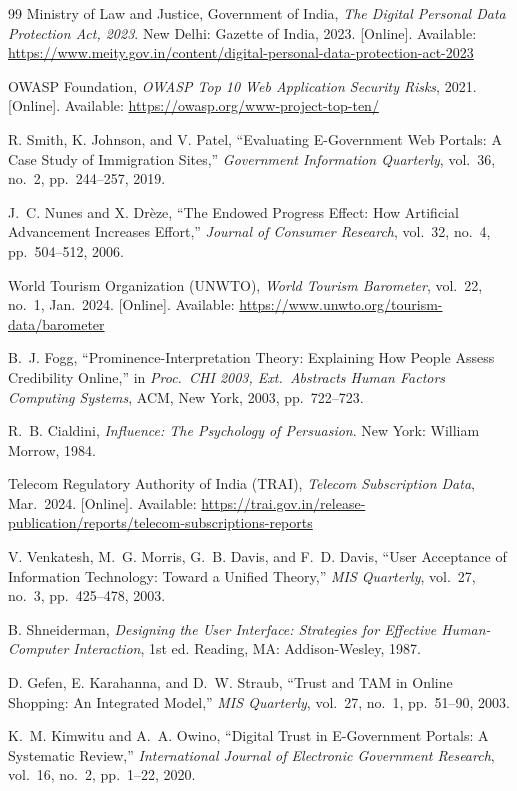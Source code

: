 \documentclass[journal, 10pt, twoside]{IEEEtran}
\begin{document}
\begin{thebibliography}{99}
  Ministry of Law and Justice, Government of India,
  \textit{The Digital Personal Data Protection Act, 2023}.
  New Delhi: Gazette of India, 2023.
  [Online]. Available:
  \url{https://www.meity.gov.in/content/digital-personal-data-protection-act-2023}

  OWASP Foundation,
  \textit{OWASP Top 10 Web Application Security Risks}, 2021.
  [Online]. Available: \url{https://owasp.org/www-project-top-ten/}

  R. Smith, K. Johnson, and V. Patel,
  ``Evaluating E-Government Web Portals: A Case Study of Immigration
  Sites,''
  \textit{Government Information Quarterly}, vol.~36, no.~2,
  pp.~244--257, 2019.

  J.~C. Nunes and X. Drèze,
  ``The Endowed Progress Effect: How Artificial Advancement Increases
  Effort,''
  \textit{Journal of Consumer Research}, vol.~32, no.~4,
  pp.~504--512, 2006.

  World Tourism Organization (UNWTO),
  \textit{World Tourism Barometer}, vol.~22, no.~1, Jan.\ 2024.
  [Online]. Available: \url{https://www.unwto.org/tourism-data/barometer}

  B.~J. Fogg,
  ``Prominence-Interpretation Theory: Explaining How People Assess
  Credibility Online,''
  in \textit{Proc.\ CHI 2003, Ext.\ Abstracts Human Factors Computing
  Systems}, ACM, New York, 2003, pp.~722--723.

  R.~B. Cialdini,
  \textit{Influence: The Psychology of Persuasion}.
  New York: William Morrow, 1984.

  Telecom Regulatory Authority of India (TRAI),
  \textit{Telecom Subscription Data}, Mar.\ 2024.
  [Online]. Available:
  \url{https://trai.gov.in/release-publication/reports/telecom-subscriptions-reports}

  V. Venkatesh, M.~G. Morris, G.~B. Davis, and F.~D. Davis,
  ``User Acceptance of Information Technology: Toward a Unified Theory,''
  \textit{MIS Quarterly}, vol.~27, no.~3, pp.~425--478, 2003.

  B. Shneiderman,
  \textit{Designing the User Interface: Strategies for Effective
  Human-Computer Interaction}, 1st ed.
  Reading, MA: Addison-Wesley, 1987.

  D. Gefen, E. Karahanna, and D.~W. Straub,
  ``Trust and TAM in Online Shopping: An Integrated Model,''
  \textit{MIS Quarterly}, vol.~27, no.~1, pp.~51--90, 2003.

  K.~M. Kimwitu and A.~A. Owino,
  ``Digital Trust in E-Government Portals: A Systematic Review,''
  \textit{International Journal of Electronic Government Research},
  vol.~16, no.~2, pp.~1--22, 2020.

\end{thebibliography}
\end{document}
